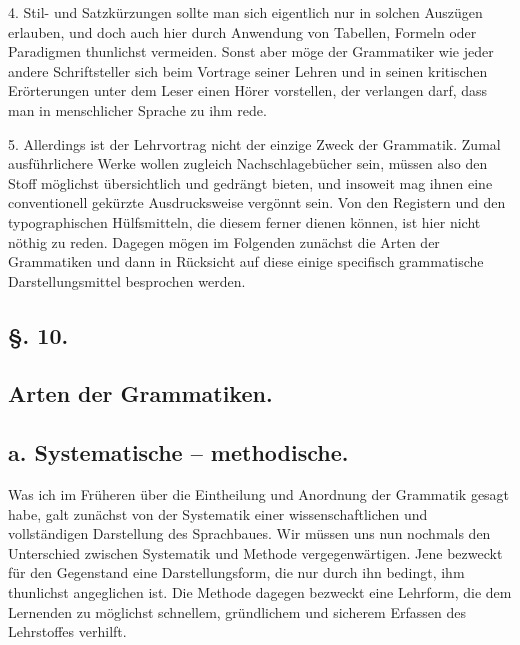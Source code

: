 4. Stil- und Satzkürzungen sollte man sich eigentlich nur in solchen Auszügen erlauben, und doch auch hier durch Anwendung von Tabellen, Formeln oder Paradigmen thunlichst vermeiden. Sonst aber möge der Grammatiker wie jeder andere Schriftsteller sich beim Vortrage seiner Lehren und in seinen kritischen Erörterungen unter dem Leser einen Hörer vorstellen, der verlangen darf, dass man in menschlicher Sprache zu ihm rede.

5. Allerdings ist der Lehrvortrag nicht der einzige Zweck der Grammatik. Zumal ausführlichere Werke wollen zugleich Nachschlagebücher sein, müssen also den Stoff möglichst übersichtlich und gedrängt bieten, und insoweit mag ihnen eine conventionell gekürzte Ausdrucksweise vergönnt sein. Von den Registern und den typographischen Hülfsmitteln, die diesem  ferner dienen können, ist hier nicht nöthig zu reden. Dagegen mögen im Folgenden zunächst die Arten der Grammatiken und dann in Rücksicht auf diese einige specifisch grammatische Darstellungsmittel besprochen werden.

\begin{styleAnmerk}
\end{styleAnmerk}

\clearpage{}
\subsection*{§. 10.}\label{II.VI.10}
\subsection*{Arten der Grammatiken.}
\subsection*{a. Systematische – methodische.}

Was ich im Früheren über die Eintheilung und Anordnung der Grammatik gesagt habe, galt zunächst von der Systematik einer wissenschaftlichen und vollständigen Darstellung des Sprachbaues. Wir müssen uns nun nochmals den Unterschied zwischen Systematik und Methode vergegenwärtigen. Jene bezweckt für den Gegenstand eine Darstellungsform, die nur durch ihn bedingt, ihm thunlichst angeglichen ist. Die Methode dagegen bezweckt eine Lehrform, die dem Lernenden zu möglichst schnellem, gründlichem und sicherem Erfassen des Lehrstoffes verhilft.

